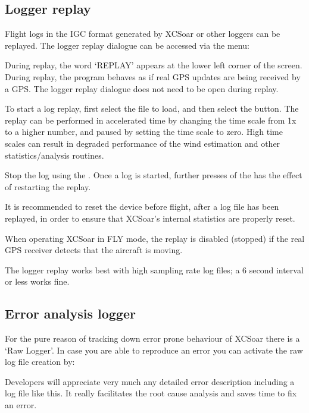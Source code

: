 \subsection*{Logger replay}\label{sec:logger-replay}
Flight logs in the IGC format generated by XCSoar or other loggers can
be replayed.  The logger replay dialogue can be accessed via the
menu:
\begin{quote}
\blink{}
\end{quote}

During replay, the word `REPLAY' appears at the lower left corner of
the screen.  During replay, the program behaves as if real GPS updates
are being received by a GPS.  The logger replay dialogue does not need
to be open during replay.

To start a log replay, first select the file to load, and then select the
 button.  The replay can be performed in accelerated time
by changing the time scale from 1x to a higher number, and paused by
setting the time scale to zero.  High time scales can result in degraded
performance of the wind estimation and other statistics/analysis routines.

Stop the log using the .
Once a log is started, further presses of the  has the
effect of restarting the replay.

\tip It is recommended to reset the device before flight, after a log
file has been replayed, in order to ensure that XCSoar's internal
statistics are properly reset.

When operating XCSoar in FLY mode, the replay is disabled (stopped) if
the real GPS receiver detects that the aircraft is moving.

The logger replay works best with high sampling rate log files;
a 6 second interval or less works fine.

\subsection*{Error analysis logger}\label{sec:raw-logger}
For the pure reason of tracking down error prone behaviour of XCSoar 
there is a `Raw Logger'. In case you are able to reproduce an error you can 
activate the raw log file creation by:
\begin{quote}
\blink{}
\end{quote}
Developers will appreciate very much any detailed error description including a log file like this. It really facilitates the root cause analysis and saves time to fix an error.

